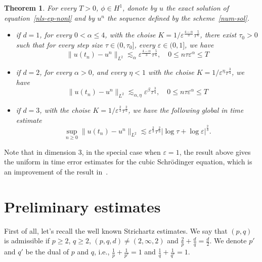 \documentclass[10pt,a4paper]{article}
\newtheorem{theorem}{Theorem}[section]
\begin{document}
  \begin{theorem}
    For every \( T > 0 \), \( \phi \in H^1 \), donote by \(u\) the exact solution
    of equation~\eqref{nls-ep-nonl} and by \(u^n\) the sequence defined by the 
    scheme~\eqref{num-sol}.
    \begin{itemize}
      \item if \(d=1\), for every \(0 < \alpha \leq 4\), with the choise 
        \(K=1/\varepsilon^\frac{4-\alpha}3\tau^\frac56\), there exist \(\tau_0 > 0\) 
        such that for every step size \(\tau \in (0,\tau_0]\), every 
        \( \varepsilon \in (0,1] \), we have 
        \[ \|u(t_n)-u^n\|_{L^2} \lesssim_\alpha \varepsilon^\frac{4-\alpha}3\tau^\frac56, \quad 
        0 \leq n\tau\varepsilon^\alpha \leq T \]
      \item if \(d=2\), for every \(\alpha > 0\), and every \(\eta < 1\) with 
        the choise \(K=1/\varepsilon^\eta\tau^\frac34\), we have
        \[ \|u(t_n)-u^n\|_{L^2} \lesssim_{\alpha,\eta} \varepsilon^\beta \tau^\frac34, \quad 
        0 \leq n\tau\varepsilon^\alpha \leq T \]
      \item if \(d=3\), with the choise \(K=1/\varepsilon^\frac23\tau^\frac23\),
        we have the following global in time estimate
        \[ \sup_{n \geq 0} \|u(t_n)-u^n\|_{L^2} \lesssim \varepsilon^\frac23 
        \tau^\frac23|\log\tau+\log\varepsilon|^\frac23. \]
    \end{itemize}
  \end{theorem}

  Note that in dimension \(3\), in the special case when \(\varepsilon=1\), the
  result above gives the uniform in time error estimates for the cubic
  Schr\"odinger equation, which is an improvement of the result in~\cite{ORS21}.


  \section{Preliminary estimates}

  First of all, let's recall the well known Strichartz estimates. We say that 
  \( (p,q) \) is admissible if \(p \geq 2\), \(q \geq 2\), \((p,q,d) \neq (2,\infty,2)\)
  and \( \frac2p + \frac{d}q = \frac{d}2 \). We denote \(p'\)
  and \(q'\) be the dual of \(p\) and \(q\), i.e., \(\frac1p+\frac1{p'} = 1\) 
  and \(\frac1q+\frac1{q'} = 1\). 
\end{document}

